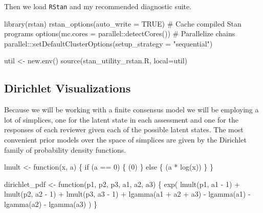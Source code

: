 \documentclass[
  letterpaper,
  DIV=11,
  numbers=noendperiod]{scrartcl}
\newenvironment{Shaded}{\begin{snugshade}}{\end{snugshade}}
\newcommand{\AttributeTok}[1]{\textcolor[rgb]{0.40,0.45,0.13}{#1}}
\newcommand{\CommentTok}[1]{\textcolor[rgb]{0.37,0.37,0.37}{#1}}
\newcommand{\ConstantTok}[1]{\textcolor[rgb]{0.56,0.35,0.01}{#1}}
\newcommand{\ControlFlowTok}[1]{\textcolor[rgb]{0.00,0.23,0.31}{#1}}
\newcommand{\DecValTok}[1]{\textcolor[rgb]{0.68,0.00,0.00}{#1}}
\newcommand{\FunctionTok}[1]{\textcolor[rgb]{0.28,0.35,0.67}{#1}}
\newcommand{\NormalTok}[1]{\textcolor[rgb]{0.00,0.23,0.31}{#1}}
\newcommand{\OtherTok}[1]{\textcolor[rgb]{0.00,0.23,0.31}{#1}}
\newcommand{\SpecialCharTok}[1]{\textcolor[rgb]{0.37,0.37,0.37}{#1}}
\newcommand{\StringTok}[1]{\textcolor[rgb]{0.13,0.47,0.30}{#1}}
\begin{document}
Then we load \texttt{RStan} and my recommended diagnostic suite.

\begin{Shaded}
\begin{Highlighting}[]
\FunctionTok{library}\NormalTok{(rstan)}
\FunctionTok{rstan\_options}\NormalTok{(}\AttributeTok{auto\_write =} \ConstantTok{TRUE}\NormalTok{)            }\CommentTok{\# Cache compiled Stan programs}
\FunctionTok{options}\NormalTok{(}\AttributeTok{mc.cores =}\NormalTok{ parallel}\SpecialCharTok{::}\FunctionTok{detectCores}\NormalTok{()) }\CommentTok{\# Parallelize chains}
\NormalTok{parallel}\SpecialCharTok{:::}\FunctionTok{setDefaultClusterOptions}\NormalTok{(}\AttributeTok{setup\_strategy =} \StringTok{"sequential"}\NormalTok{)}

\NormalTok{util }\OtherTok{\textless{}{-}} \FunctionTok{new.env}\NormalTok{()}
\FunctionTok{source}\NormalTok{(}\StringTok{\textquotesingle{}stan\_utility\_rstan.R\textquotesingle{}}\NormalTok{, }\AttributeTok{local=}\NormalTok{util)}
\end{Highlighting}
\end{Shaded}

\hypertarget{dirichlet-visualizations}{%
\subsection{Dirichlet Visualizations}\label{dirichlet-visualizations}}

Because we will be working with a finite consensus model we will be
employing a lot of simplices, one for the latent state in each
assessment and one for the responses of each reviewer given each of the
possible latent states. The most convenient prior models over the space
of simplices are given by the Dirichlet family of probability density
functions.

\begin{Shaded}
\begin{Highlighting}[]
\NormalTok{lmult }\OtherTok{\textless{}{-}} \ControlFlowTok{function}\NormalTok{(x, a) \{}
  \ControlFlowTok{if}\NormalTok{ (a }\SpecialCharTok{==} \DecValTok{0}\NormalTok{) \{}
\NormalTok{    (}\DecValTok{0}\NormalTok{)}
\NormalTok{  \} }\ControlFlowTok{else}\NormalTok{ \{}
\NormalTok{    (a }\SpecialCharTok{*} \FunctionTok{log}\NormalTok{(x))}
\NormalTok{  \}}
\NormalTok{\}}

\NormalTok{dirichlet\_pdf }\OtherTok{\textless{}{-}} \ControlFlowTok{function}\NormalTok{(p1, p2, p3, a1, a2, a3) \{}
  \FunctionTok{exp}\NormalTok{(  }\FunctionTok{lmult}\NormalTok{(p1, a1 }\SpecialCharTok{{-}} \DecValTok{1}\NormalTok{) }\SpecialCharTok{+} \FunctionTok{lmult}\NormalTok{(p2, a2 }\SpecialCharTok{{-}} \DecValTok{1}\NormalTok{) }\SpecialCharTok{+} \FunctionTok{lmult}\NormalTok{(p3, a3 }\SpecialCharTok{{-}} \DecValTok{1}\NormalTok{)}
      \SpecialCharTok{+} \FunctionTok{lgamma}\NormalTok{(a1 }\SpecialCharTok{+}\NormalTok{ a2 }\SpecialCharTok{+}\NormalTok{ a3) }\SpecialCharTok{{-}} \FunctionTok{lgamma}\NormalTok{(a1) }\SpecialCharTok{{-}} \FunctionTok{lgamma}\NormalTok{(a2) }\SpecialCharTok{{-}} \FunctionTok{lgamma}\NormalTok{(a3) )}
\NormalTok{\}}
\end{Highlighting}
\end{Shaded}
\end{document}
